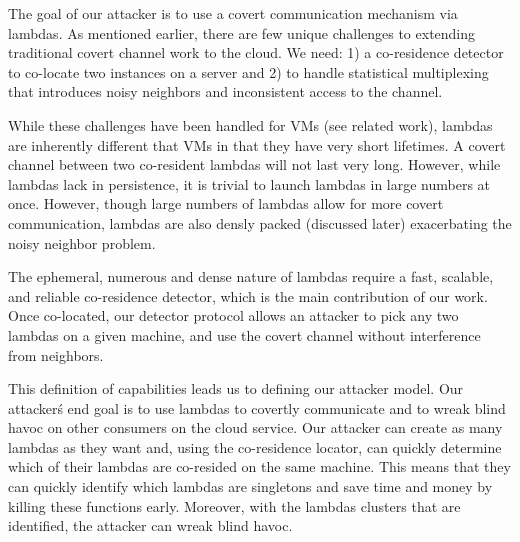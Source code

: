 
The goal of our attacker is to use a covert communication mechanism via lambdas.
As mentioned earlier, there are few unique challenges to extending traditional
covert channel work to the cloud. We need: 1) a co-residence detector to
co-locate two instances on a server and 2) to handle statistical multiplexing
that introduces noisy neighbors and inconsistent access to the channel.

While these challenges have been handled for VMs (see related work), lambdas are
inherently different that VMs in that they have very short lifetimes. A covert
channel between two co-resident lambdas will not last very long. However, while
lambdas lack in persistence, it is trivial to launch lambdas in large numbers at
once. However, though large numbers of lambdas allow for more covert communication,
lambdas are also densly packed (discussed later) exacerbating the noisy
neighbor problem.

The ephemeral, numerous and dense nature of lambdas require a fast,
scalable, and reliable co-residence detector, which is the main contribution of
our work. Once co-located, our detector protocol allows an attacker to pick any
two lambdas on a given machine, and use the covert channel without interference
from neighbors.

This definition of capabilities leads us to defining our attacker model.
Our attacker\'s end goal is to use lambdas to covertly communicate and to
wreak blind havoc on other consumers on the cloud service. Our attacker can
create as many lambdas as they want and, using the co-residence locator, can
quickly determine which of their lambdas are co-resided on the same machine.
This means that they can quickly identify which lambdas are singletons and save
time and money by killing these functions early. Moreover, with the lambdas
clusters that are identified, the attacker can wreak blind havoc.
